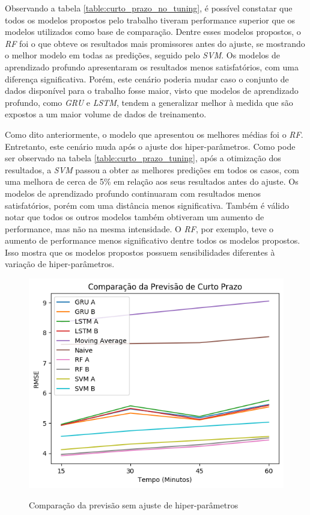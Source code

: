  Observando a tabela \ref{table:curto_prazo_no_tuning}, é possível constatar que todos os modelos propostos pelo trabalho tiveram performance superior que os modelos utilizados como base de comparação. Dentre esses modelos propostos, o \textit{\acrshort{RF}} foi o que obteve os resultados mais promissores antes do ajuste, se mostrando o melhor modelo em todas as predições, seguido pelo \textit{\acrshort{SVM}}. Os modelos de aprendizado profundo apresentaram os resultados menos satisfatórios, com uma diferença significativa. Porém, este cenário poderia mudar caso o conjunto de dados disponível para o trabalho fosse maior, visto que modelos de aprendizado profundo, como \textit{\acrshort{GRU}} e \textit{\acrshort{LSTM}}, tendem a generalizar melhor à medida que são expostos a um maior volume de dados de treinamento. 

Como dito anteriormente, o modelo que apresentou os melhores médias foi o \textit{\acrshort{RF}}. Entretanto, este cenário muda após o ajuste dos hiper-parâmetros. Como pode ser observado na tabela \ref{table:curto_prazo_tuning}, após a otimização dos resultados, a \textit{\acrshort{SVM}} passou a obter as melhores predições em todos os casos, com uma melhora de cerca de 5\% em relação aos seus resultados antes do ajuste. Os modelos de aprendizado profundo continuaram com resultados menos satisfatórios, porém com uma distância menos significativa. Também é válido notar que todos os outros modelos também obtiveram um aumento de performance, mas não na mesma intensidade. O \textit{\acrshort{RF}}, por exemplo, teve o aumento de performance menos significativo dentre todos os modelos propostos. Isso mostra que os modelos propostos possuem sensibilidades diferentes à variação de hiper-parâmetros.
 
 \begin{figure}[H]
    \centering
    \includegraphics[scale=0.9]{monography/img/comparisons/comparacao_da_previsao_de_curto_prazo_rmse.png}
    \label{figure:pred_no_tuning}
    \caption{Comparação da previsão sem ajuste de hiper-parâmetros}
\end{figure}

